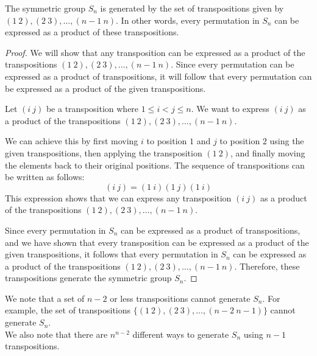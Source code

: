 \documentclass[openany]{book}
\begin{document}
\begin{mytheorem}
    The symmetric group \( S_n \) is generated by the set of transpositions given by $(1 \ 2), (2 \ 3), \ldots, (n-1 \ n)$. In other words, every permutation in \( S_n \) can be expressed as a product of these transpositions.
\end{mytheorem}
\begin{proof}
    We will show that any transposition can be expressed as a product of the transpositions \( (1 \ 2), (2 \ 3), \ldots, (n-1 \ n) \). Since every permutation can be expressed as a product of transpositions, it will follow that every permutation can be expressed as a product of the given transpositions.

    Let \( (i \ j) \) be a transposition where \( 1 \leq i < j \leq n \). We want to express \( (i \ j) \) as a product of the transpositions \( (1 \ 2), (2 \ 3), \ldots, (n-1 \ n) \).

    We can achieve this by first moving \( i \) to position \( 1 \) and \( j \) to position \( 2 \) using the given transpositions, then applying the transposition \( (1 \ 2) \), and finally moving the elements back to their original positions. The sequence of transpositions can be written as follows:
    \[
    (i\ j) = (1\ i)(1\ j)(1\ i)
    \]
    This expression shows that we can express any transposition \( (i\ j) \) as a product of the transpositions \( (1\ 2), (2\ 3), \ldots, (n-1\ n) \).

    Since every permutation in \( S_n \) can be expressed as a product of transpositions, and we have shown that every transposition can be expressed as a product of the given transpositions, it follows that every permutation in \( S_n \) can be expressed as a product of the transpositions \( (1\ 2), (2\ 3), \ldots, (n-1\ n) \). Therefore, these transpositions generate the symmetric group \( S_n \).
\end{proof}
\begin{mynote}
    We note that a set of $n-2$ or less transpositions cannot generate $S_n$. For example, the set of transpositions $\{(1\ 2), (2\ 3), \ldots, (n-2\ n-1)\}$ cannot generate $S_n$. \\
    We also note that there are $n^{n-2}$ different ways to generate $S_n$ using $n-1$ transpositions.
\end{mynote}
\end{document}

